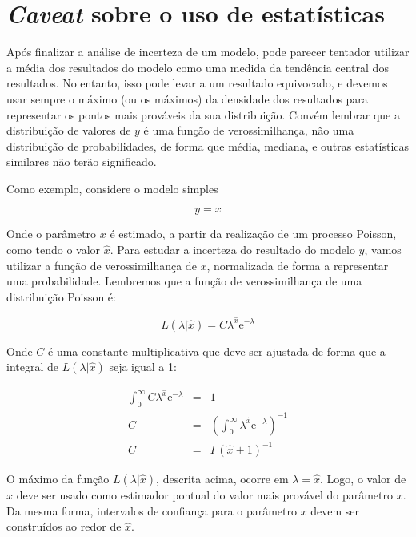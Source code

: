 \section{{\em Caveat} sobre o uso de estatísticas}

Ap\'os finalizar a an\'alise de incerteza de um modelo, pode parecer
tentador utilizar a m\'edia dos resultados do modelo como uma medida
da tend\^encia central dos resultados. No entanto, isso pode levar
a um resultado equivocado, e devemos usar sempre o m\'aximo
(ou os m\'aximos) da densidade dos resultados para representar os
pontos mais prov\'aveis da sua distribui\c c\~ao. Convém lembrar
que a distribuição de valores de $y$ é uma função de verossimilhança,
não uma distribuição de probabilidades, de forma que média, mediana,
e outras estatísticas similares não terão significado.

Como exemplo, considere o modelo simples

\begin{equation}
	y = x
\end{equation}

Onde o par\^ametro $x$ \'e estimado, a partir da realiza\c c\~ao de um
processo Poisson, como tendo o valor $\hat x$. Para estudar a incerteza
do resultado do modelo $y$, vamos utilizar a fun\c c\~ao de verossimilhan\c ca
de $x$, normalizada de forma a representar uma probabilidade. Lembremos que
a fun\c c\~ao de verossimilhan\c ca de uma distribui\c c\~ao Poisson
\'e:

\begin{equation}
	L \left( \lambda | \hat x \right) = C \lambda^{\hat x} \mathrm{e}^{-\lambda}
\end{equation}

Onde $C$ \'e uma constante multiplicativa que deve ser ajustada de forma
que a integral de $L(\lambda | \hat x)$ seja igual a 1:

\begin {eqnarray*}
\int_0^\infty C \lambda^{\hat x} \mathrm{e}^{-\lambda} & = & 1 \\
C & = & \left( \int_0^\infty  \lambda^{\hat x} \mathrm{e}^{-\lambda} \right)^{-1} \\
C & = & \Gamma(\hat x +1)^{-1}
\end{eqnarray*}

O m\'aximo da fun\c c\~ao $L(\lambda | \hat x)$, descrita acima, ocorre em $\lambda = \hat x$.
Logo, o valor de $\hat x$ deve ser usado como estimador pontual do valor mais prov\'avel
do par\^ametro $x$. Da mesma forma, intervalos de confian\c ca para o par\^ametro $x$ devem
ser constru\'idos ao redor de $\hat x$.

